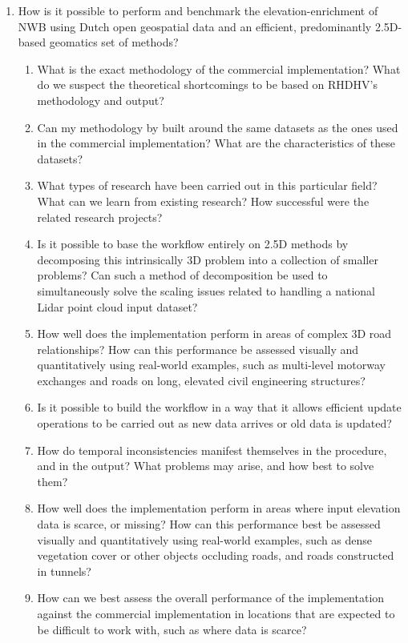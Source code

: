 \begin{enumerate}
    \item How is it possible to perform and benchmark the elevation-enrichment of NWB using Dutch open geospatial data and an efficient, predominantly 2.5D-based geomatics set of methods?
    \begin{enumerate}
        \item What is the exact methodology of the commercial implementation? What do we suspect the theoretical shortcomings to be based on RHDHV's methodology and output?
        \item Can my methodology by built around the same datasets as the ones used in the commercial implementation? What are the characteristics of these datasets?
        \item What types of research have been carried out in this particular field? What can we learn from existing research? How successful were the related research projects?
        \item Is it possible to base the workflow entirely on 2.5D methods by decomposing this intrinsically 3D problem into a collection of smaller problems? Can such a method of decomposition be used to simultaneously solve the scaling issues related to handling a national Lidar point cloud input dataset?
        \item How well does the implementation perform in areas of complex 3D road relationships? How can this performance be assessed visually and quantitatively using real-world examples, such as multi-level motorway exchanges and roads on long, elevated civil engineering structures?
        \item Is it possible to build the workflow in a way that it allows efficient update operations to be carried out as new data arrives or old data is updated?
        \item How do temporal inconsistencies manifest themselves in the procedure, and in the output? What problems may arise, and how best to solve them?
        \item How well does the implementation perform in areas where input elevation data is scarce, or missing? How can this performance best be assessed visually and quantitatively using real-world examples, such as dense vegetation cover or other objects occluding roads, and roads constructed in tunnels?
        \item How can we best assess the overall performance of the implementation against the commercial implementation in locations that are expected to be difficult to work with, such as where data is scarce?

\end{enumerate}
\end{enumerate}

